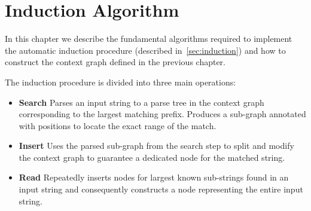 \chapter{Induction Algorithm}\label{chp:induction_algorithm}


In this chapter we describe the fundamental algorithms required to implement the automatic induction procedure (described in~\ref{sec:induction}) and how to construct the context graph defined in the previous chapter.

\noindent
The induction procedure is divided into three main operations:

\begin{itemize}
\item \textbf{Search} Parses an input string to a parse tree in the context graph corresponding to the largest matching prefix. Produces a sub-graph annotated with positions to locate the exact range of the match. 
\item \textbf{Insert} Uses the parsed sub-graph from the search step to split and modify the context graph to guarantee a dedicated node for the matched string.
\item \textbf{Read} Repeatedly inserts nodes for largest known sub-strings found in an input string and consequently constructs a node representing the entire input string.
\end{itemize}






